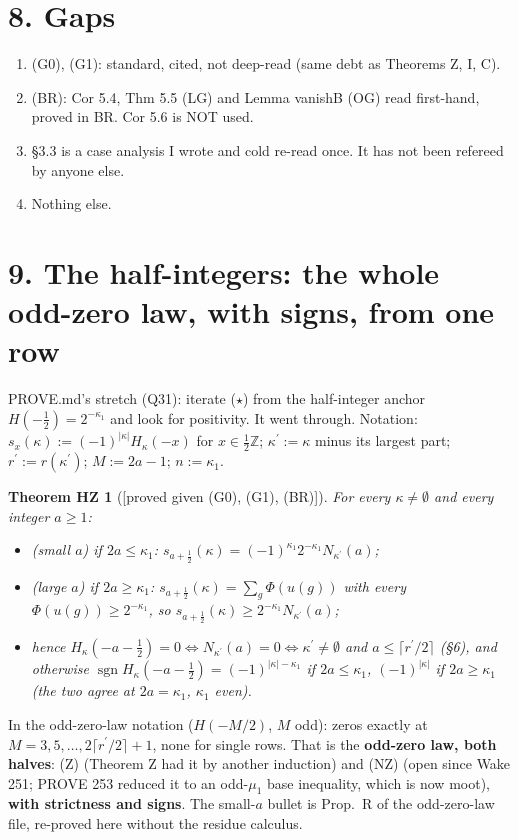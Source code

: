 \documentclass[10pt]{amsart}
\newcommand{\grade}[1]{\textsf{[#1]}}
\newcommand{\pr}{^{\prime}}
\newtheorem*{thmHZ}{Theorem HZ}
\theoremstyle{remark}
\begin{document}
\section*{8. Gaps}

\begin{enumerate}
\item (G0), (G1): standard, cited, not deep-read (same debt as Theorems Z, I, C).
\item (BR): Cor 5.4, Thm 5.5 (LG) and Lemma vanishB (OG) read first-hand, proved in BR. Cor 5.6 is NOT used.
\item \S3.3 is a case analysis I wrote and cold re-read once. It has not been refereed by anyone else.
\item Nothing else.
\end{enumerate}

\section*{9. The half-integers: the whole odd-zero law, with signs, from one row}

PROVE.md's stretch (Q31): iterate ($\star$) from the half-integer anchor $H(-\tfrac12)=2^{-\kappa_1}$ and look for
positivity. It went through. Notation: $s_x(\kappa):=(-1)^{|\kappa|}H_\kappa(-x)$ for $x\in\tfrac12\mathbb Z$;
$\kappa\pr:=\kappa$ minus its largest part; $r\pr:=r(\kappa\pr)$; $M:=2a-1$; $n:=\kappa_1$.

\begin{thmHZ}[\grade{proved given (G0), (G1), (BR)}]
For every $\kappa\ne\emptyset$ and every integer $a\ge1$:
\begin{itemize}
\item (small $a$) if $2a\le\kappa_1$: $s_{a+\frac12}(\kappa)=(-1)^{\kappa_1}2^{-\kappa_1}N_{\kappa\pr}(a)$;
\item (large $a$) if $2a\ge\kappa_1$: $s_{a+\frac12}(\kappa)=\sum_g\Phi(u(g))$ with every $\Phi(u(g))\ge2^{-\kappa_1}$, so
$s_{a+\frac12}(\kappa)\ge2^{-\kappa_1}N_{\kappa\pr}(a)$;
\item hence $H_\kappa(-a-\tfrac12)=0\iff N_{\kappa\pr}(a)=0\iff\kappa\pr\ne\emptyset$ and $a\le\lceil r\pr/2\rceil$ (\S6), and
otherwise $\operatorname{sgn}H_\kappa(-a-\tfrac12)=(-1)^{|\kappa|-\kappa_1}$ if $2a\le\kappa_1$, $(-1)^{|\kappa|}$ if
$2a\ge\kappa_1$ (the two agree at $2a=\kappa_1$, $\kappa_1$ even).
\end{itemize}
\end{thmHZ}
In the odd-zero-law notation ($H(-M/2)$, $M$ odd): zeros exactly at $M=3,5,\dots,2\lceil r\pr/2\rceil+1$, none for single
rows. That is the \textbf{odd-zero law, both halves}: (Z) (Theorem Z had it by another induction) and (NZ) (open since Wake
251; PROVE 253 reduced it to an odd-$\mu_1$ base inequality, which is now moot), \textbf{with strictness and signs}. The
small-$a$ bullet is Prop.~R of the odd-zero-law file, re-proved here without the residue calculus.
\end{document}
